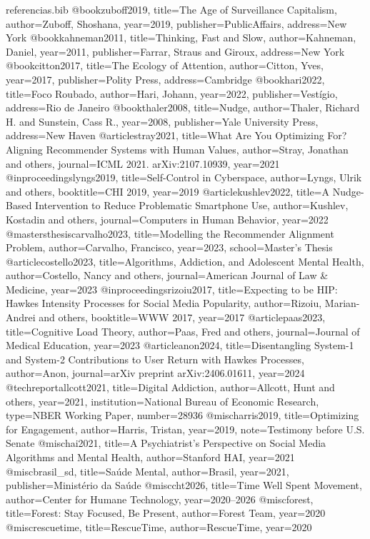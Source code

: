 \begin{filecontents*}{referencias.bib}
@book{zuboff2019,
  title={The Age of Surveillance Capitalism},
  author={Zuboff, Shoshana},
  year={2019},
  publisher={PublicAffairs},
  address={New York}
}
@book{kahneman2011,
  title={Thinking, Fast and Slow},
  author={Kahneman, Daniel},
  year={2011},
  publisher={Farrar, Straus and Giroux},
  address={New York}
}
@book{citton2017,
  title={The Ecology of Attention},
  author={Citton, Yves},
  year={2017},
  publisher={Polity Press},
  address={Cambridge}
}
@book{hari2022,
  title={Foco Roubado},
  author={Hari, Johann},
  year={2022},
  publisher={Vestígio},
  address={Rio de Janeiro}
}
@book{thaler2008,
  title={Nudge},
  author={Thaler, Richard H. and Sunstein, Cass R.},
  year={2008},
  publisher={Yale University Press},
  address={New Haven}
}
@article{stray2021,
  title={What Are You Optimizing For? Aligning Recommender Systems with Human Values},
  author={Stray, Jonathan and others},
  journal={ICML 2021. arXiv:2107.10939},
  year={2021}
}
@inproceedings{lyngs2019,
  title={Self-Control in Cyberspace},
  author={Lyngs, Ulrik and others},
  booktitle={CHI 2019},
  year={2019}
}
@article{kushlev2022,
  title={A Nudge-Based Intervention to Reduce Problematic Smartphone Use},
  author={Kushlev, Kostadin and others},
  journal={Computers in Human Behavior},
  year={2022}
}
@mastersthesis{carvalho2023,
  title={Modelling the Recommender Alignment Problem},
  author={Carvalho, Francisco},
  year={2023},
  school={Master's Thesis}
}
@article{costello2023,
  title={Algorithms, Addiction, and Adolescent Mental Health},
  author={Costello, Nancy and others},
  journal={American Journal of Law \& Medicine},
  year={2023}
}
@inproceedings{rizoiu2017,
  title={Expecting to be HIP: Hawkes Intensity Processes for Social Media Popularity},
  author={Rizoiu, Marian-Andrei and others},
  booktitle={WWW 2017},
  year={2017}
}
@article{paas2023,
  title={Cognitive Load Theory},
  author={Paas, Fred and others},
  journal={Journal of Medical Education},
  year={2023}
}
@article{anon2024,
  title={Disentangling System-1 and System-2 Contributions to User Return with Hawkes Processes},
  author={Anon},
  journal={arXiv preprint arXiv:2406.01611},
  year={2024}
}
@techreport{allcott2021,
  title={Digital Addiction},
  author={Allcott, Hunt and others},
  year={2021},
  institution={National Bureau of Economic Research},
  type={NBER Working Paper},
  number={28936}
}
@misc{harris2019,
  title={Optimizing for Engagement},
  author={Harris, Tristan},
  year={2019},
  note={Testimony before U.S. Senate}
}
@misc{hai2021,
  title={A Psychiatrist's Perspective on Social Media Algorithms and Mental Health},
  author={{Stanford HAI}},
  year={2021}
}
@misc{brasil_sd,
  title={Saúde Mental},
  author={Brasil},
  year={2021},
  publisher={Ministério da Saúde}
}
@misc{cht2026,
  title={Time Well Spent Movement},
  author={{Center for Humane Technology}},
  year={2020--2026}
}
@misc{forest,
  title={Forest: Stay Focused, Be Present},
  author={{Forest Team}},
  year={2020}
}
@misc{rescuetime,
  title={RescueTime},
  author={{RescueTime}},
  year={2020}
}
\end{filecontents*}

